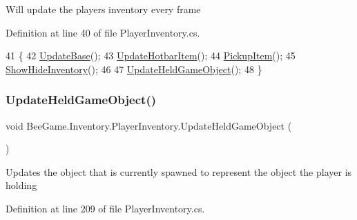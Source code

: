 Will update the players inventory every frame 



Definition at line 40 of file Player\+Inventory.\+cs.


\begin{DoxyCode}
41         \{
42             \hyperlink{class_bee_game_1_1_inventory_1_1_inventory_base_aa1a965cf7ba9e04b22a4ef85ad133854}{UpdateBase}();
43             \hyperlink{class_bee_game_1_1_inventory_1_1_player_inventory_a1b86d5439ebb9f5dc6d9fefe3351cdc7}{UpdateHotbarItem}();
44             \hyperlink{class_bee_game_1_1_inventory_1_1_player_inventory_a84caefeadcff40e4fd6e888307a7a1e9}{PickupItem}();
45             \hyperlink{class_bee_game_1_1_inventory_1_1_player_inventory_a226c92d8b805827199cdd1ed9796a326}{ShowHideInventory}();
46             
47             \hyperlink{class_bee_game_1_1_inventory_1_1_player_inventory_a469e47caa8a5bbb4fad1fdd5ec5b4113}{UpdateHeldGameObject}();
48         \}
\end{DoxyCode}
\mbox{\label{class_bee_game_1_1_inventory_1_1_player_inventory_a469e47caa8a5bbb4fad1fdd5ec5b4113}} 
\subsubsection{\texorpdfstring{Update\+Held\+Game\+Object()}{UpdateHeldGameObject()}}
{\footnotesize\ttfamily void Bee\+Game.\+Inventory.\+Player\+Inventory.\+Update\+Held\+Game\+Object (\begin{DoxyParamCaption}{ }\end{DoxyParamCaption})\hspace{0.3cm}{\ttfamily [private]}}



Updates the object that is currently spawned to represent the object the player is holding 



Definition at line 209 of file Player\+Inventory.\+cs.


